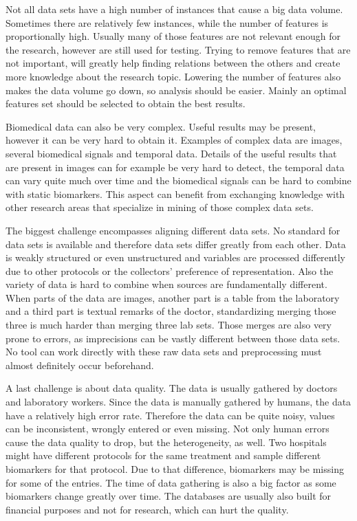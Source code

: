 \documentclass[10pt,a4paper]{article}
\begin{document}
	Not all data sets have a high number of instances that cause a big data volume. Sometimes there are relatively few instances, while the number of features is proportionally high. \cite{dubitzky2007fundamentals} Usually many of those features are not relevant enough for the research, however are still used for testing. Trying to remove features that are not important, will greatly help finding relations between the others and create more knowledge about the research topic. Lowering the number of features also makes the data volume go down, so analysis should be easier. Mainly an optimal features set should be selected to obtain the best results. \cite{PENG201015}
	
	Biomedical data can also be very complex. Useful results may be present, however it can be very hard to obtain it. Examples of complex data are images, several biomedical signals and temporal data. Details of the useful results that are present in images can for example be very hard to detect, the temporal data can vary quite much over time and the biomedical signals can be hard to combine with static biomarkers. \cite{Yoo2012} This aspect can benefit from exchanging knowledge with other research areas that specialize in mining of those complex data sets. \cite{Turkay2014, bellazzi2011data}
	
	The biggest challenge encompasses aligning different data sets. No standard for data sets is available and therefore data sets differ greatly from each other. Data is weakly structured or even unstructured \cite{Holzinger2014} and variables are processed differently due to other protocols or the collectors' preference of representation. \cite{Otasek2014} Also the variety of data is hard to combine when sources are fundamentally different. When parts of the data are images, another part is a table from the laboratory and a third part is textual remarks of the doctor, standardizing merging those three is much harder than merging three lab sets. Those merges are also very prone to errors, as imprecisions can be vastly different between those data sets. No tool can work directly with these raw data sets and preprocessing must almost definitely occur beforehand. \cite{Turkay2014, CIOS20021}
	
	A last challenge is about data quality. The data is usually gathered by doctors and laboratory workers. Since the data is manually gathered by humans, the data have a relatively high error rate. Therefore the data can be quite noisy, values can be inconsistent, wrongly entered or even missing. \cite{CIOS20021} Not only human errors cause the data quality to drop, but the heterogeneity, as well. Two hospitals might have different protocols for the same treatment and sample different biomarkers for that protocol. Due to that difference, biomarkers may be missing for some of the entries. The time of data gathering is also a big factor as some biomarkers change greatly over time. The databases are usually also built for financial purposes and not for research, which can hurt the quality. \cite{Yoo2012}
	
\end{document}
